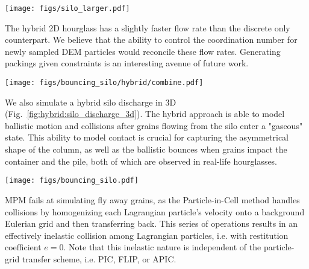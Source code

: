 \begin{center}
  \centering
  \texttt{[image: figs/silo\_larger.pdf]}
  \label{fig:hybrid:silo_discharge}
\end{center}

The hybrid 2D hourglass has a slightly faster flow rate than the discrete only counterpart. We believe that the ability to control the coordination number for newly sampled DEM particles would reconcile these flow rates. Generating packings given constraints is an interesting avenue of future work.

\begin{center}
  \centering
  \texttt{[image: figs/bouncing\_silo/hybrid/combine.pdf]}
  \label{fig:hybrid:silo_discharge_3d}
\end{center}

We also simulate a hybrid silo discharge in 3D (Fig.~\ref{fig:hybrid:silo_discharge_3d}). The hybrid approach is able to model ballistic motion and collisions after grains flowing from the silo enter a "gaseous" state. This ability to model contact is crucial for capturing the asymmetrical shape of the column, as well as the ballistic bounces when grains impact the container and the pile, both of which are observed in real-life hourglasses.
\begin{center}
  \centering
  \texttt{[image: figs/bouncing\_silo.pdf]}
  \label{COR-compare}
\end{center}

MPM fails at simulating fly away grains, as the Particle-in-Cell method handles collisions by homogenizing each Lagrangian particle's velocity onto a background Eulerian grid and then transferring back. This series of operations results in an effectively inelastic collision among Lagrangian particles, i.e. with restitution coefficient $e = 0$. Note that this inelastic nature is independent of the particle-grid transfer scheme, i.e. PIC, FLIP, or APIC.


